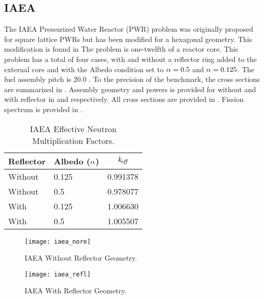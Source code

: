   \subsection{IAEA}
    \label{sec:iaea}
    The IAEA Pressurized Water Reactor (PWR) problem was originally proposed for
    square lattice PWRs but has been modified for a hexagonal geometry. This
    modification is found in \cite{chao} The problem is one-twelfth of a reactor
    core. This problem has a total of four cases, with and without a reflector
    ring added to the external core and with the Albedo condition set to
    $\alpha = 0.5$ and $\alpha = 0.125$. The fuel assembly pitch is 20.0
    . To the precision of the benchmark, the cross sections are
    summarized in .
    Assembly geometry and powers is provided for without and with 
    reflector in  and  
    respectively. All cross sections are provided in . Fission
    spectrum is provided in .
    \begin{table}
      \caption{IAEA Effective Neutron Multiplication Factors.}
      \label{tab:iaeakeff}
      \begin{center}
        \begin{tabular}{llc}
          \toprule
          Reflector & Albedo ($\alpha$) & $k_{\!\mbox{\scriptsize \em eff}}$ \\
          \midrule
          Without & 0.125 & 0.991378 \\
          Without & 0.5   & 0.978077 \\
          With    & 0.125 & 1.006630 \\
          With    & 0.5   & 1.005507 \\
          \bottomrule
        \end{tabular}
      \end{center}
    \end{table}
    \begin{figure}
      \centering
      \texttt{[image: iaea\_nore]}
      \caption{IAEA Without Reflector Geometry.}
      \label{fig:iaea_nore_geom}
    \end{figure}
    \begin{figure}
      \centering
      \texttt{[image: iaea\_refl]}
      \caption{IAEA With Reflector Geometry.}
      \label{fig:iaea_refl_geom}
    \end{figure}
